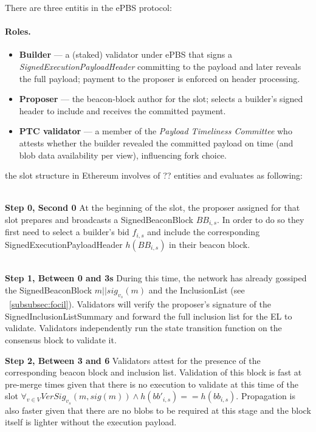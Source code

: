 There are three entitis in the ePBS protocol:
\paragraph{Roles.}
\begin{itemize}
    \item \textbf{Builder} — a (staked) validator under ePBS that signs a \emph{SignedExecutionPayloadHeader} committing to the payload and later reveals the full payload; payment to the proposer is enforced on header processing.
    \item \textbf{Proposer} — the beacon-block author for the slot; selects a builder's signed header to include and receives the committed payment.
    \item \textbf{PTC validator} — a member of the \emph{Payload Timeliness Committee} who attests whether the builder revealed the committed payload on time (and blob data availability per view), influencing fork choice.
\end{itemize}
the slot structure in Ethereum involves of ?? entities and evaluates as following:


\\[8pt]
\noindent\textbf{Step 0, Second 0} At the beginning of the slot, the proposer assigned for that slot prepares and broadcasts a SignedBeaconBlock $BB_{i,s}$. In order to do so they first need to select a builder's bid ${f_{i,s}}$ and include the corresponding SignedExecutionPayloadHeader $h(BB_{i,s})$ in their beacon block.

\\[8pt]
\noindent\textbf{Step 1, Between 0 and 3s} During this time, the network has already gossiped the SignedBeaconBlock $m || sig_{v_s} (m)$ and the InclusionList (see ~\ref{subsubsec:focil}). Validators will verify the proposer's signature of the SignedInclusionListSummary and forward the full inclusion list for the EL to validate. Validators independently run the state transition function on the consensus block to validate it.

\noindent\textbf{Step 2, Between 3 and 6} Validators attest for the presence of the corresponding beacon block and inclusion list. Validation of this block is fast at pre-merge times given that there is no execution to validate at this time of the slot $\forall_{v \in V} VerSig_{v_s}(m, sig(m)) \land h(bb'_{i,s}) == h(bb_{i,s})$. Propagation is also faster given that there are no blobs to be required at this stage and the block itself is lighter without the execution payload.


